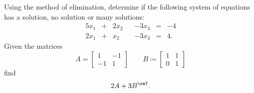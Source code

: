 \begin{questions}[10]
  Using the method of elimination, determine if the following system of
  equations has a solution, no solution or many solutions:
  \begin{alignat*}{5}
    x_1&+&2x_2&&-3x_3&=&-4\\
    2x_1&+&x_2&&-3x_3&=&4.\nonumber
  \end{alignat*}
%
  \bigskip\bigskip\bigskip\bigskip\bigskip\bigskip
  \bigskip\bigskip\bigskip\bigskip\bigskip\bigskip
%
  \question[5] Given the matrices
  \[
    A=
    \begin{bmatrix}
      1&-1\\
      -1&1
    \end{bmatrix}
    \qquad
    B\coloneq
    \begin{bmatrix}
      1&1\\
      0&1
    \end{bmatrix}
  \]
  find
  \[
    2A+3B^\rmT.
  \]
\end{questions}

